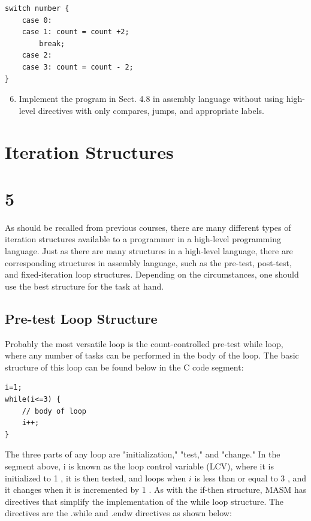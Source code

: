 \documentclass[10pt]{article}
\begin{document}
\begin{verbatim}
switch number {
    case 0:
    case 1: count = count +2;
        break;
    case 2:
    case 3: count = count - 2;
}
\end{verbatim}

\begin{enumerate}
  \setcounter{enumi}{5}
  \item Implement the program in Sect. 4.8 in assembly language without using high-level directives with only compares, jumps, and appropriate labels.
\end{enumerate}

\section*{Iteration Structures}
\section*{5}
As should be recalled from previous courses, there are many different types of iteration structures available to a programmer in a high-level programming language. Just as there are many structures in a high-level language, there are corresponding structures in assembly language, such as the pre-test, post-test, and fixed-iteration loop structures. Depending on the circumstances, one should use the best structure for the task at hand.

\subsection*{Pre-test Loop Structure}
Probably the most versatile loop is the count-controlled pre-test while loop, where any number of tasks can be performed in the body of the loop. The basic structure of this loop can be found below in the C code segment:

\begin{verbatim}
i=1;
while(i<=3) {
    // body of loop
    i++;
}
\end{verbatim}

The three parts of any loop are "initialization," "test," and "change." In the segment above, i is known as the loop control variable (LCV), where it is initialized to 1 , it is then tested, and loops when $i$ is less than or equal to 3 , and it changes when it is incremented by 1 . As with the if-then structure, MASM has directives that simplify the implementation of the while loop structure. The directives are the .while and .endw directives as shown below:
\end{document}

